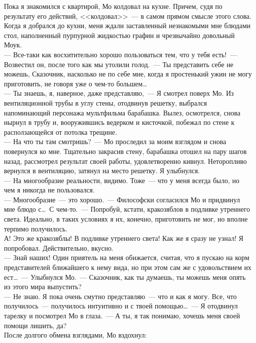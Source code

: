 Пока я знакомился с квартирой, Мо колдовал на кухне. Причем, судя по результату 
его действий, <<колдовал>>~--- в самом прямом смысле этого слова. Когда я 
добрался до кухни, меня ждали заставленный незнакомыми мне блюдами стол, наполненный 
пурпурной жидкостью графин и чрезвычайно довольный Моук.\\
--- Все-таки как восхитительно хорошо пользоваться тем, что у тебя есть!~--- 
Возвестил он, после того как мы утолили голод.~--- Ты представить себе не 
можешь, Сказочник, насколько не по себе мне, когда я простенький ужин не могу 
приготовить, не говоря уже о чем-то большем\ldots\\
--- Ты знаешь, я, наверное, даже представляю,~--- Я смотрел поверх Мо. Из 
вентиляционной трубы в углу стены, отодвинув решетку, выбрался напоминающий 
персонажа мультфильма барабашка. Вылез, осмотрелся, снова нырнул в трубу и, 
вооружившись ведерком и кисточкой, побежал по стене к расползающейся от потолка 
трещине.\\
--- На что ты там смотришь?~--- Мо проследил за моим взглядом и снова повернулся 
ко мне. Тщательно закрасив стену, барабашка отошел на пару шагов назад, рассмотрел 
результат своей работы, удовлетворенно кивнул. Неторопливо вернулся в 
вентиляцию, затянул на место решетку. Я улыбнулся.\\
--- На многообразие реальности, видимо. Тоже~--- что у меня всегда было, но чем я 
никогда не пользовался.\\
--- Многообразие~--- это хорошо.~--- Философски согласился Мо и придвинул мне 
блюдо с\ldots\ С чем-то.~--- Попробуй, кстати, кракозяблов в подливке утреннего света. 
Идеально, в таких условиях я их, конечно, приготовить не мог, но вполне терпимо 
получилось.\\
А! Это же кракозяблы! В подливке утреннего света! Как же я сразу не узнал! Я 
попробовал. Действительно, вкусно.\\
--- Знай наших! Один приятель на меня обижается, считая, что я пускаю на корм 
представителей ближайшего к нему вида, но при этом сам же с удовольствием их 
ест\ldots~--- Улыбнулся Мо.~--- Сказочник, как ты думаешь, ты можешь меня опять 
из этого мира выпустить? \\
--- Не знаю. Я пока очень смутно представляю~--- что и как я могу. Все, что 
получилось~--- получилось интуитивно и с твоей помощью\ldots~--- Я отодвинул 
тарелку и посмотрел Мо в глаза.~--- А ты, я так понимаю, хочешь меня своей помощи лишить, 
да?\\
После долгого обмена взглядами, Мо вздохнул:\\
